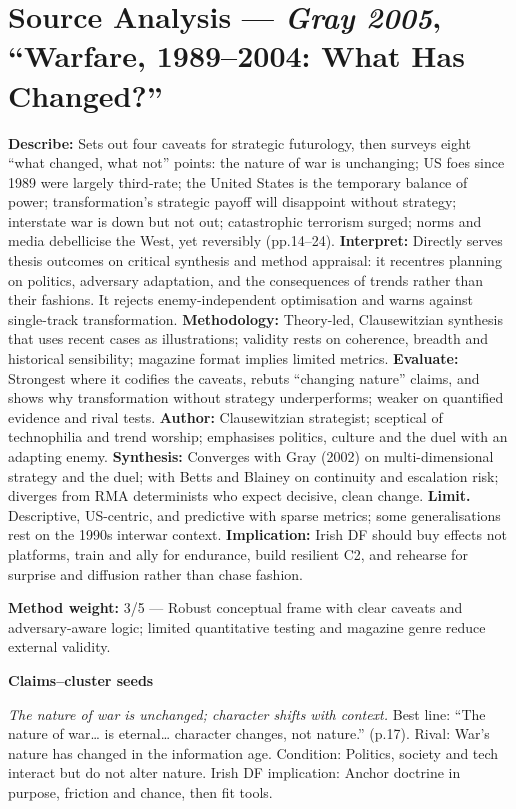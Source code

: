 \section*{Source Analysis — \textit{Gray 2005}, “Warfare, 1989–2004: What Has Changed?”}
\textbf{Describe:} Sets out four caveats for strategic futurology, then surveys eight “what changed, what not” points: the nature of war is unchanging; US foes since 1989 were largely third-rate; the United States is the temporary balance of power; transformation’s strategic payoff will disappoint without strategy; interstate war is down but not out; catastrophic terrorism surged; norms and media debellicise the West, yet reversibly (pp.14–24).
\textbf{Interpret:} Directly serves thesis outcomes on critical synthesis and method appraisal: it recentres planning on politics, adversary adaptation, and the consequences of trends rather than their fashions. It rejects enemy-independent optimisation and warns against single-track transformation.
\textbf{Methodology:} Theory-led, Clausewitzian synthesis that uses recent cases as illustrations; validity rests on coherence, breadth and historical sensibility; magazine format implies limited metrics.
\textbf{Evaluate:} Strongest where it codifies the caveats, rebuts “changing nature” claims, and shows why transformation without strategy underperforms; weaker on quantified evidence and rival tests.
\textbf{Author:} Clausewitzian strategist; sceptical of technophilia and trend worship; emphasises politics, culture and the duel with an adapting enemy.
\textbf{Synthesis:} Converges with Gray (2002) on multi-dimensional strategy and the duel; with Betts and Blainey on continuity and escalation risk; diverges from RMA determinists who expect decisive, clean change.
\textbf{Limit.} Descriptive, US-centric, and predictive with sparse metrics; some generalisations rest on the 1990s interwar context.
\textbf{Implication:} Irish DF should buy effects not platforms, train and ally for endurance, build resilient C2, and rehearse for surprise and diffusion rather than chase fashion.

\textbf{Method weight:} 3/5 — Robust conceptual frame with clear caveats and adversary-aware logic; limited quantitative testing and magazine genre reduce external validity.

\textbf{Claims–cluster seeds}

\textit{The nature of war is unchanged; character shifts with context.} Best line: “The nature of war… is eternal… character changes, not nature.” (p.17). Rival: War’s nature has changed in the information age. Condition: Politics, society and tech interact but do not alter nature. Irish DF implication: Anchor doctrine in purpose, friction and chance, then fit tools.

